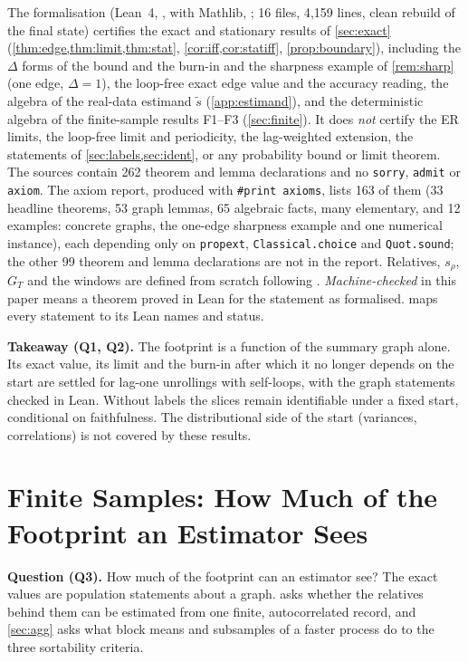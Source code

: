 \documentclass[pdflatex,sn-apa]{sn-jnl}
\theoremstyle{thmstyleone}
\theoremstyle{thmstylethree}
\theoremstyle{thmstyletwo}
\newcommand{\GT}{G_T}
\newcommand{\srho}{s_\rho}
\begin{document}
The formalisation (Lean~4, \citealp{demoura2021lean4}, with Mathlib,
\citealp{mathlib2020}; 16 files, 4{,}159 lines, clean rebuild of the final
state) certifies the exact and stationary results of \cref{sec:exact}
(\cref{thm:edge,thm:limit,thm:stat}, \cref{cor:iff,cor:statiff},
\cref{prop:boundary}), including the $\Delta$ forms of the bound and the
burn-in and the sharpness example of \cref{rem:sharp} (one edge, $\Delta=1$),
the loop-free exact edge value and the accuracy reading, the algebra of the
real-data estimand $\tilde s$ (\cref{app:estimand}), and the deterministic
algebra of the finite-sample results F1--F3 (\cref{sec:finite}). It does \emph{not} certify the ER limits, the loop-free
limit and periodicity, the lag-weighted extension, the statements of
\cref{sec:labels,sec:ident}, or any probability bound or limit theorem. The
sources contain 262 theorem and lemma declarations and no \texttt{sorry},
\texttt{admit} or \texttt{axiom}. The axiom report, produced with
\texttt{\#print axioms}, lists 163 of them (33 headline theorems, 53 graph
lemmas, 65 algebraic facts, many elementary, and 12 examples: concrete graphs, the
one-edge sharpness example and one numerical instance), each depending only on \texttt{propext},
\texttt{Classical.choice} and \texttt{Quot.sound}; the other 99 theorem and
lemma declarations are not in the report. Relatives, $\srho$, $\GT$ and the windows are defined from scratch
following \citet{reisach2026topological}. \emph{Machine-checked} in this
paper means a theorem proved in Lean for the statement as formalised.
 maps every statement to its Lean names and status.

\textbf{Takeaway (Q1, Q2).} The footprint is a function of the summary graph
alone. Its exact value, its limit and the burn-in after which it no longer
depends on the start are settled for lag-one unrollings with self-loops, with
the graph statements checked in Lean. Without labels the slices remain
identifiable under a fixed start, conditional on faithfulness. The
distributional side of the start (variances, correlations) is not covered by
these results.

\section{Finite Samples: How Much of the Footprint an Estimator Sees}
\label{sec:finsamp}

\textbf{Question (Q3).} How much of the footprint can an estimator see? The
exact values are population statements about a graph.
 asks whether the relatives behind them can be estimated from
one finite, autocorrelated record, and \cref{sec:agg} asks what block means and
subsamples of a faster process do to the three sortability criteria.
\end{document}
